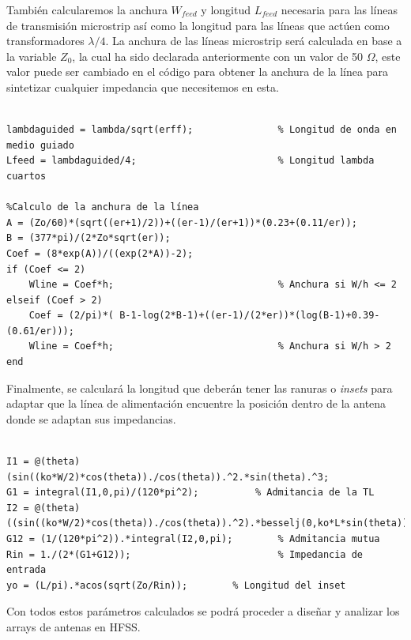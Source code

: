 \par También calcularemos la anchura $W_{feed}$ y longitud $L_{feed}$ necesaria para las líneas de transmisión microstrip así como la longitud para las líneas que actúen como transformadores $\lambda /4$. La anchura de las líneas microstrip será calculada en base a la variable $Z_{0}$, la cual ha sido declarada anteriormente con un valor de 50 $\Omega$, este valor puede ser cambiado en el código para obtener la anchura de la línea para sintetizar cualquier impedancia que necesitemos en esta.

\begin{lstlisting}[style=Matlab-color, caption={Parámetros de diseño de la línea de alimentación},label=alimentacion]
%% Cálculos de línea de alimentación

lambdaguided = lambda/sqrt(erff);               % Longitud de onda en medio guiado
Lfeed = lambdaguided/4;                         % Longitud lambda cuartos

%Calculo de la anchura de la línea
A = (Zo/60)*(sqrt((er+1)/2))+((er-1)/(er+1))*(0.23+(0.11/er)); 
B = (377*pi)/(2*Zo*sqrt(er));
Coef = (8*exp(A))/((exp(2*A))-2);
if (Coef <= 2)
	Wline = Coef*h;                             % Anchura si W/h <= 2
elseif (Coef > 2)
    Coef = (2/pi)*( B-1-log(2*B-1)+((er-1)/(2*er))*(log(B-1)+0.39-(0.61/er)));
	Wline = Coef*h;                             % Anchura si W/h > 2
end
\end{lstlisting}

\par Finalmente, se calculará la longitud que deberán tener las ranuras o \textit{insets} para adaptar que la línea de alimentación encuentre la posición dentro de la antena donde se adaptan sus impedancias.

\begin{lstlisting}[style=Matlab-color, caption={Parámetros de diseño del \textit{inset}},label=inset]
%% Inset

I1 = @(theta) (sin((ko*W/2)*cos(theta))./cos(theta)).^2.*sin(theta).^3;
G1 = integral(I1,0,pi)/(120*pi^2);          % Admitancia de la TL
I2 = @(theta) ((sin((ko*W/2)*cos(theta))./cos(theta)).^2).*besselj(0,ko*L*sin(theta)).*sin(theta).^3;
G12 = (1/(120*pi^2)).*integral(I2,0,pi);        % Admitancia mutua
Rin = 1./(2*(G1+G12));                          % Impedancia de entrada
yo = (L/pi).*acos(sqrt(Zo/Rin));        % Longitud del inset
\end{lstlisting}

\par Con todos estos parámetros calculados se podrá proceder a diseñar y analizar los arrays de antenas en HFSS.


